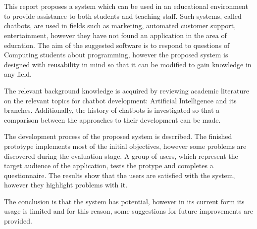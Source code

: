 \documentclass[12pt,a4paper]{article}
\makeatletter
\renewenvironment{abstract}{%
    \if@twocolumn
      \section*{\abstractname}%
    \else %
      \begin{center}%
        {\bfseries \Large\abstractname\vspace{\z@}}%
      \end{center}%
      \quotation
    \fi}
    {\if@twocolumn\else\endquotation\fi}
\newcommand\frontmatter{%
    \cleardoublepage
  \pagenumbering{roman}}
\makeatother
\begin{document}
 \frontmatter



\pagebreak

\pagebreak

\begin{abstract}
	This report proposes a system which can be used in an educational environment to provide assistance to both students and teaching staff. Such systems, called chatbots, are used in fields such as marketing, automated customer support, entertainment, however they have not found an application in the area of education. The aim of the suggested software is to respond to questions of Computing students about programming, however the proposed system is designed with reusability in mind so that it can be modified to gain knowledge in any field.
	
	The relevant background knowledge is acquired by reviewing academic literature on the relevant topics for chatbot development: Artificial Intelligence and its branches. Additionally, the history of chatbots is investigated so that a comparison between the approaches to their development can be made. 
	
	The development process of the proposed system is described. The finished prototype implements most of the initial objectives, however some problems are discovered during the evaluation stage. A group of users, which represent the target audience of the application, tests the protype and completes a questionnaire. The results show that the users are satisfied with the system, however they highlight problems with it.
	
	The conclusion is that the system has potential, however in its current form its usage is limited and for this reason, some suggestions for future improvements are provided.
\end{abstract}
\pagebreak

\tableofcontents %
\newpage

\listoftables
\newpage


\listoffigures
\newpage
\end{document}
